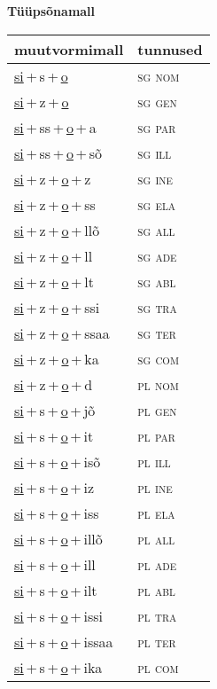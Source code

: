 
\vspace{1.8em}
\begin{minipage}{\textwidth}
\textbf{Tüüpsõnamall \,}\\

\begin{sideways}
\begin{tabular}{l l}
muutvormimall & tunnused \\
\hline
\underline{si}\,+\,s\,+\,\underline{o} & \textsc{ sg nom } \\
\underline{si}\,+\,z\,+\,\underline{o} & \textsc{ sg gen } \\
\underline{si}\,+\,ss\,+\,\underline{o}\,+\,a & \textsc{ sg par } \\
\underline{si}\,+\,ss\,+\,\underline{o}\,+\,sõ & \textsc{ sg ill } \\
\underline{si}\,+\,z\,+\,\underline{o}\,+\,z & \textsc{ sg ine } \\
\underline{si}\,+\,z\,+\,\underline{o}\,+\,ss & \textsc{ sg ela } \\
\underline{si}\,+\,z\,+\,\underline{o}\,+\,llõ & \textsc{ sg all } \\
\underline{si}\,+\,z\,+\,\underline{o}\,+\,ll & \textsc{ sg ade } \\
\underline{si}\,+\,z\,+\,\underline{o}\,+\,lt & \textsc{ sg abl } \\
\underline{si}\,+\,z\,+\,\underline{o}\,+\,ssi & \textsc{ sg tra } \\
\underline{si}\,+\,z\,+\,\underline{o}\,+\,ssaa & \textsc{ sg ter } \\
\underline{si}\,+\,z\,+\,\underline{o}\,+\,ka & \textsc{ sg com } \\
\underline{si}\,+\,z\,+\,\underline{o}\,+\,d & \textsc{ pl nom } \\
\underline{si}\,+\,s\,+\,\underline{o}\,+\,jõ & \textsc{ pl gen } \\
\underline{si}\,+\,s\,+\,\underline{o}\,+\,it & \textsc{ pl par } \\
\underline{si}\,+\,s\,+\,\underline{o}\,+\,isõ & \textsc{ pl ill } \\
\underline{si}\,+\,s\,+\,\underline{o}\,+\,iz & \textsc{ pl ine } \\
\underline{si}\,+\,s\,+\,\underline{o}\,+\,iss & \textsc{ pl ela } \\
\underline{si}\,+\,s\,+\,\underline{o}\,+\,illõ & \textsc{ pl all } \\
\underline{si}\,+\,s\,+\,\underline{o}\,+\,ill & \textsc{ pl ade } \\
\underline{si}\,+\,s\,+\,\underline{o}\,+\,ilt & \textsc{ pl abl } \\
\underline{si}\,+\,s\,+\,\underline{o}\,+\,issi & \textsc{ pl tra } \\
\underline{si}\,+\,s\,+\,\underline{o}\,+\,issaa & \textsc{ pl ter } \\
\underline{si}\,+\,s\,+\,\underline{o}\,+\,ika & \textsc{ pl com } \\
\end{tabular}
\end{sideways}
\label{tab:tüüpsõnamall-siso}


\end{minipage}
